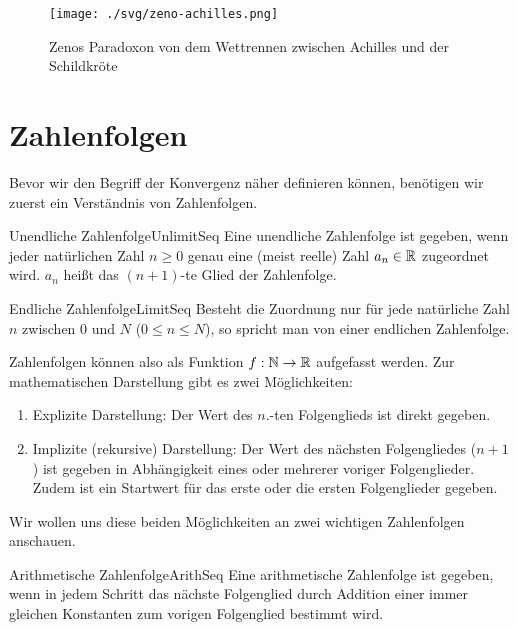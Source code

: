 \begin{figure}
	\centering
	\texttt{[image: ./svg/zeno-achilles.png]}
	\caption[Zenos Paradoxon des Wettrennens]{Zenos Paradoxon von dem Wettrennen zwischen Achilles und der Schildkröte}
	\label{fig:ZenoAchilles}
\end{figure}

\section{Zahlenfolgen}

Bevor wir den Begriff der Konvergenz näher definieren können, benötigen wir zuerst ein Verständnis von Zahlenfolgen.

\begin{definition}{Unendliche Zahlenfolge}{UnlimitSeq}
	Eine unendliche Zahlenfolge ist gegeben, wenn jeder natürlichen Zahl $n \ge 0$  genau eine (meist reelle) Zahl $a_n\in\mathbb{R}$ zugeordnet wird. $a_n$ heißt das $(n+1)$-te Glied der Zahlenfolge.
\end{definition}

\begin{definition}{Endliche Zahlenfolge}{LimitSeq}
	Besteht die Zuordnung nur für jede natürliche Zahl $n$ zwischen 0 und $N$ ($0 \le n \le N$), so spricht man von einer endlichen Zahlenfolge.
\end{definition}

Zahlenfolgen können also als Funktion $f: \mathbb{N} \to \mathbb{R}$ aufgefasst werden. Zur mathematischen Darstellung gibt es zwei Möglichkeiten:

\begin{enumerate}
	\item Explizite Darstellung: Der Wert des $n$.-ten Folgenglieds ist direkt gegeben.
	\item Implizite (rekursive) Darstellung: Der Wert des nächsten Folgengliedes ($n+1$) ist gegeben in Abhängigkeit eines oder mehrerer voriger Folgenglieder. Zudem ist ein Startwert für das erste oder die ersten Folgenglieder gegeben.
\end{enumerate}

Wir wollen uns diese beiden Möglichkeiten an zwei wichtigen Zahlenfolgen anschauen.

\begin{definition}{Arithmetische Zahlenfolge}{ArithSeq}
	Eine arithmetische Zahlenfolge ist gegeben, wenn in jedem Schritt das nächste Folgenglied durch Addition einer immer gleichen Konstanten zum vorigen Folgenglied bestimmt wird.
\end{definition}

